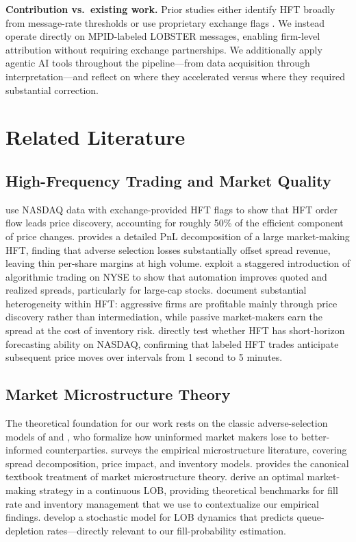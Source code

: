 \documentclass[11pt, letterpaper]{article}
\begin{document}
\textbf{Contribution vs.\ existing work.}
Prior studies either identify HFT broadly from message-rate thresholds
\citep{Hasbrouck2013} or use proprietary exchange flags \citep{Brogaard2014}.
We instead operate directly on MPID-labeled LOBSTER messages, enabling
firm-level attribution without requiring exchange partnerships.
We additionally apply agentic AI tools throughout the pipeline---from data
acquisition through interpretation---and reflect on where they accelerated
versus where they required substantial correction.

\section{Related Literature}

\subsection{High-Frequency Trading and Market Quality}

\citet{Brogaard2014} use NASDAQ data with exchange-provided HFT flags to show
that HFT order flow leads price discovery, accounting for roughly 50\% of
the efficient component of price changes.
\citet{Menkveld2013} provides a detailed PnL decomposition of a large
market-making HFT, finding that adverse selection losses substantially offset
spread revenue, leaving thin per-share margins at high volume.
\citet{Hendershott2011} exploit a staggered introduction of algorithmic trading
on NYSE to show that automation improves quoted and realized spreads,
particularly for large-cap stocks.
\citet{Baron2019} document substantial heterogeneity within HFT: aggressive
firms are profitable mainly through price discovery rather than intermediation,
while passive market-makers earn the spread at the cost of inventory risk.
\citet{Carrion2013} directly test whether HFT has short-horizon forecasting
ability on NASDAQ, confirming that labeled HFT trades anticipate subsequent
price moves over intervals from 1 second to 5 minutes.

\subsection{Market Microstructure Theory}

The theoretical foundation for our work rests on the classic adverse-selection
models of \citet{Glosten1985} and \citet{Kyle1985}, who formalize how
uninformed market makers lose to better-informed counterparties.
\citet{Madhavan2000} surveys the empirical microstructure literature,
covering spread decomposition, price impact, and inventory models.
\citet{OHara1995} provides the canonical textbook treatment of market
microstructure theory.
\citet{AvellanedaStoikov2008} derive an optimal market-making strategy in a
continuous LOB, providing theoretical benchmarks for fill rate and
inventory management that we use to contextualize our empirical findings.
\citet{ContStoikov2010} develop a stochastic model for LOB dynamics that
predicts queue-depletion rates---directly relevant to our fill-probability
estimation.
\end{document}
